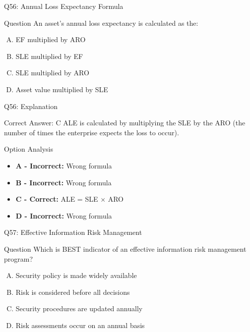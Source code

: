 \documentclass{beamer}
\begin{document}
	\begin{frame}{Q56: Annual Loss Expectancy Formula}
		\begin{block}{Question}
			An asset's annual loss expectancy is calculated as the:
		\end{block}
		\begin{enumerate}[(A)]
			\item EF multiplied by ARO
			\item SLE multiplied by EF
			\item SLE multiplied by ARO
			\item Asset value multiplied by SLE
		\end{enumerate}
	\end{frame}
	
	\begin{frame}{Q56: Explanation}
		\begin{block}{Correct Answer: C}
			ALE is calculated by multiplying the SLE by the ARO (the number of times the enterprise expects the loss to occur).
		\end{block}
		\begin{block}{Option Analysis}
			\begin{itemize}
				\item \textbf{A - Incorrect:} Wrong formula
				\item \textbf{B - Incorrect:} Wrong formula
				\item \textbf{C - Correct:} ALE = SLE × ARO
				\item \textbf{D - Incorrect:} Wrong formula
			\end{itemize}
		\end{block}
	\end{frame}
	
	\begin{frame}{Q57: Effective Information Risk Management}
		\begin{block}{Question}
			Which is BEST indicator of an effective information risk management program?
		\end{block}
		\begin{enumerate}[(A)]
			\item Security policy is made widely available
			\item Risk is considered before all decisions
			\item Security procedures are updated annually
			\item Risk assessments occur on an annual basis
		\end{enumerate}
	\end{frame}
	
\end{document}
